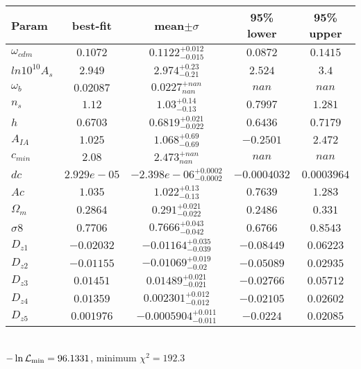 \begin{tabular}{|l|c|c|c|c|} 
 \hline 
Param & best-fit & mean$\pm\sigma$ & 95\% lower & 95\% upper \\ \hline 
$\omega_{cdm }$ &$0.1072$ & $0.1122_{-0.015}^{+0.012}$ & $0.0872$ & $0.1415$ \\ 
$ln10^{10}A_{s }$ &$2.949$ & $2.974_{-0.21}^{+0.23}$ & $2.524$ & $3.4$ \\ 
$\omega_{b }$ &$0.02087$ & $0.0227_{nan}^{+nan}$ & $nan$ & $nan$ \\ 
$n_{s }$ &$1.12$ & $1.03_{-0.13}^{+0.14}$ & $0.7997$ & $1.281$ \\ 
$h$ &$0.6703$ & $0.6819_{-0.022}^{+0.021}$ & $0.6436$ & $0.7179$ \\ 
$A_{IA }$ &$1.025$ & $1.068_{-0.69}^{+0.69}$ & $-0.2501$ & $2.472$ \\ 
$c_{min }$ &$2.08$ & $2.473_{nan}^{+nan}$ & $nan$ & $nan$ \\ 
$dc$ &$2.929e-05$ & $-2.398e-06_{-0.0002}^{+0.0002}$ & $-0.0004032$ & $0.0003964$ \\ 
$Ac$ &$1.035$ & $1.022_{-0.13}^{+0.13}$ & $0.7639$ & $1.283$ \\ 
$\Omega_{m }$ &$0.2864$ & $0.291_{-0.022}^{+0.021}$ & $0.2486$ & $0.331$ \\ 
$\sigma8$ &$0.7706$ & $0.7666_{-0.042}^{+0.043}$ & $0.6766$ & $0.8543$ \\ 
$D_{z1 }$ &$-0.02032$ & $-0.01164_{-0.039}^{+0.035}$ & $-0.08449$ & $0.06223$ \\ 
$D_{z2 }$ &$-0.01155$ & $-0.01069_{-0.02}^{+0.019}$ & $-0.05089$ & $0.02935$ \\ 
$D_{z3 }$ &$0.01451$ & $0.01489_{-0.021}^{+0.021}$ & $-0.02766$ & $0.05712$ \\ 
$D_{z4 }$ &$0.01359$ & $0.002301_{-0.012}^{+0.012}$ & $-0.02105$ & $0.02602$ \\ 
$D_{z5 }$ &$0.001976$ & $-0.0005904_{-0.011}^{+0.011}$ & $-0.0224$ & $0.02085$ \\ 
\hline 
 \end{tabular} \\ 
$-\ln{\cal L}_\mathrm{min} =96.1331$, minimum $\chi^2=192.3$ \\ 
